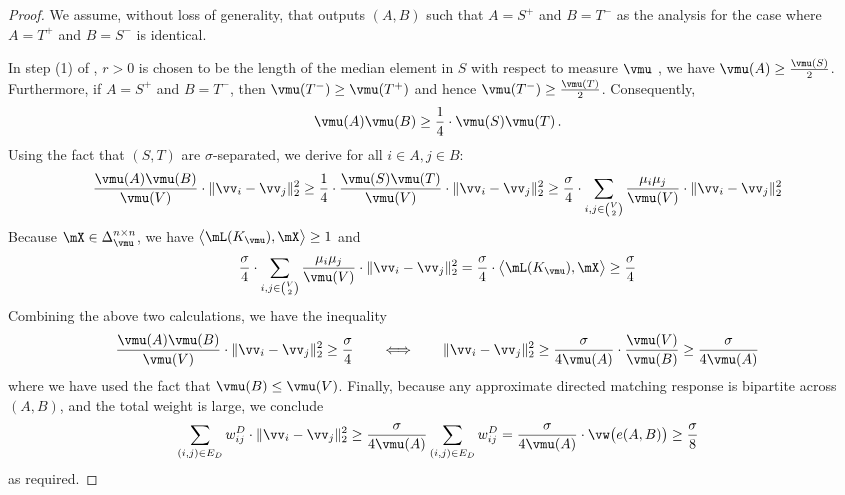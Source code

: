 \documentclass[letterpaper]{article}
\begin{document}
\begin{proof}
We assume, without loss of generality, that \dirroundcut outputs $(A, B)$ such that $A = S^+$ and $B = T^-$ as the analysis for the case where $A = T^+$ and $B = S^-$ is identical.

In step (1) of \dirroundcut, $r > 0$ is chosen to be the length of the median element in $S$ with respect to measure $\vmu$
, we have $\vmu(A) \geq \frac{\vmu(S)}{2}$. Furthermore, if $A = S^+$ and $B = T^-$, then $\vmu(T^-) \geq \vmu(T^+)$ and hence $\vmu(T^-) \geq \frac{\vmu(T)}{2}$. Consequently,
\begin{equation*}
\vmu(A) \vmu(B) \geq \frac{1}{4} \cdot \vmu(S) \vmu(T) \, .
\end{equation*}
Using the fact that $(S, T)$ are $\sigma$-separated, we derive for all $i \in A, j \in B$:
\begin{equation*}
\frac{\vmu(A) \vmu(B)}{\vmu(V)} \cdot \lVert \vv_i - \vv_j \rVert^2_2
\geq \frac{1}{4} \cdot \frac{\vmu(S) \vmu(T)}{\vmu(V)} \cdot \lVert \vv_i - \vv_j \rVert^2_2
\geq \frac{\sigma}{4} \cdot \sum_{i,j \in \binom{V}{2}} \frac{\mu_i \mu_j}{\vmu(V)} \cdot \lVert \vv_i - \vv_j \rVert_2^2
\end{equation*}
Because $\mX \in \Delta_{\vmu}^{n \times n}$, we have $\big\langle \mL(K_{\vmu}), \mX \big\rangle \geq 1$ and
\begin{equation*}
\frac{\sigma}{4} \cdot \sum_{i,j \in \binom{V}{2}} \frac{\mu_i \mu_j}{\vmu(V)} \cdot \lVert \vv_i - \vv_j \rVert_2^2
= \frac{\sigma}{4} \cdot \big\langle \mL(K_{\vmu}), \mX \big\rangle
\geq \frac{\sigma}{4}
\end{equation*}
Combining the above two calculations, we have the inequality
\begin{equation*}
\frac{\vmu(A) \vmu(B)}{\vmu(V)} \cdot \lVert \vv_i - \vv_j \rVert^2_2
\geq \frac{\sigma}{4}
\qquad\Longleftrightarrow\qquad
\lVert \vv_i - \vv_j \rVert^2_2
\geq \frac{\sigma}{4 \vmu(A)} \cdot \frac{\vmu(V)}{\vmu(B)}
\geq \frac{\sigma}{4 \vmu(A)}
\end{equation*}
where we have used the fact that $\vmu(B) \leq \vmu(V)$. Finally, because any approximate directed matching response is bipartite across $(A, B)$, and the total weight is large, we conclude
\begin{equation*}
\sum_{(i, j) \in E_D} w_{ij}^D \cdot \lVert \vv_i - \vv_j \rVert_2^2
\geq \frac{\sigma}{4 \vmu(A)} \sum_{(i, j) \in E_D} w_{ij}^D
= \frac{\sigma}{4 \vmu(A)} \cdot \vw \big( e(A, B) \big)
\geq \frac{\sigma}{8}
\end{equation*}
as required.
\end{proof}
\end{document}
